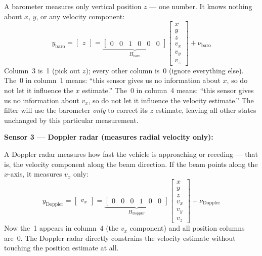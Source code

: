 \documentclass[12pt, a4paper]{article}
\begin{document}
\begin{notebox}
  A barometer measures only vertical position $z$ --- one number.
  It knows nothing about $x$, $y$, or any velocity component:
  \[
    y_\text{baro}
    = \begin{bmatrix} z \end{bmatrix}
    = \underbrace{\begin{bmatrix}
        0 & 0 & 1 & 0 & 0 & 0
      \end{bmatrix}}_{H_\text{baro}}
    \begin{bmatrix} x \\ y \\ z \\ v_x \\ v_y \\ v_z \end{bmatrix}
    + \nu_\text{baro}
  \]
  Column~3 is~1 (pick out $z$); every other column is~0
  (ignore everything else).
  The~0 in column~1 means: ``this sensor gives us no information about $x$,
  so do not let it influence the $x$ estimate.''
  The~0 in column~4 means: ``this sensor gives us no information about $v_x$,
  so do not let it influence the velocity estimate.''
  The filter will use the barometer \emph{only} to correct its $z$ estimate,
  leaving all other states unchanged by this particular measurement.

  \bigskip
  \textbf{Sensor 3 --- Doppler radar (measures radial velocity only):}

  A Doppler radar measures how fast the vehicle is approaching or receding
  --- that is, the velocity component along the beam direction.
  If the beam points along the $x$-axis, it measures $v_x$ only:
  \[
    y_\text{Doppler}
    = \begin{bmatrix} v_x \end{bmatrix}
    = \underbrace{\begin{bmatrix}
        0 & 0 & 0 & 1 & 0 & 0
      \end{bmatrix}}_{H_\text{Doppler}}
    \begin{bmatrix} x \\ y \\ z \\ v_x \\ v_y \\ v_z \end{bmatrix}
    + \nu_\text{Doppler}
  \]
  Now the~1 appears in column~4 (the $v_x$ component) and all position
  columns are~0.
  The Doppler radar directly constrains the velocity estimate without
  touching the position estimate at all.


\end{notebox}
\end{document}
